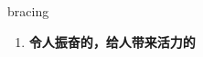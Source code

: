
\begin{frame}
{\huge bracing}
\begin{center}
\begin{enumerate}\Large
  \item \textbf{令人振奋的，给人带来活力的}
\end{enumerate}
\end{center}
\end{frame}
